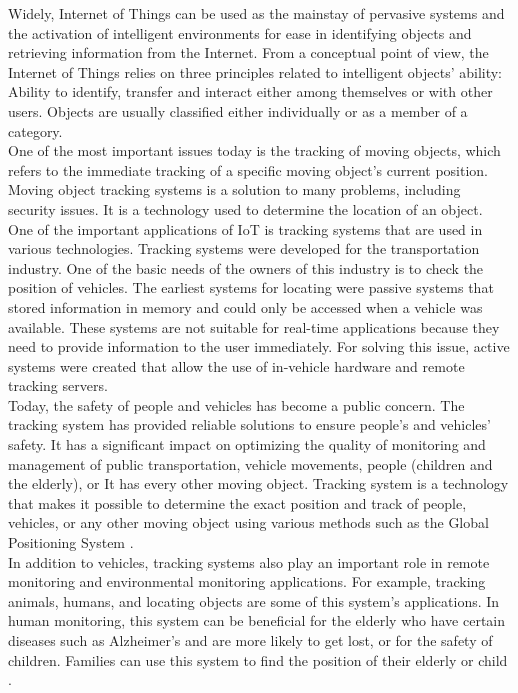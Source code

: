 Widely, Internet of Things can be used as the mainstay of pervasive systems and the activation of intelligent environments for ease in identifying objects and retrieving information from the Internet.
From a conceptual point of view, the Internet of Things relies on three principles related to intelligent objects' ability:
Ability to identify, transfer and interact either among themselves or with other users. Objects are usually classified either individually or as a member of a category.\\
One of the most important issues today is the tracking of moving objects, which refers to the immediate tracking of a specific moving object's current position. Moving object tracking systems is a solution to many problems, including security issues. It is a technology used to determine the location of an object.\\
One of the important applications of IoT is tracking systems that are used in various technologies. Tracking systems were developed for the transportation industry. One of the basic needs of the owners of this industry is to check the position of vehicles. The earliest systems for locating were passive systems that stored information in memory and could only be accessed when a vehicle was available. These systems are not suitable for real-time applications because they need to provide information to the user immediately. For solving this issue, active systems were created that allow the use of in-vehicle hardware and remote tracking servers.\\
Today, the safety of people and vehicles has become a public concern. The tracking system has provided reliable solutions to ensure people's and vehicles' safety. It has a significant impact on optimizing the quality of monitoring and management of public transportation, vehicle movements, people (children and the elderly), or It has every other moving object. Tracking system is a technology that makes it possible to determine the exact position and track of people, vehicles, or any other moving object using various methods such as the Global Positioning System \cite{3}.\\
In addition to vehicles, tracking systems also play an important role in remote monitoring and environmental monitoring applications. For example, tracking animals, humans, and locating objects are some of this system's applications. In human monitoring, this system can be beneficial for the elderly who have certain diseases such as Alzheimer's and are more likely to get lost, or for the safety of children. Families can use this system to find the position of their elderly or child \cite{4}.\\
